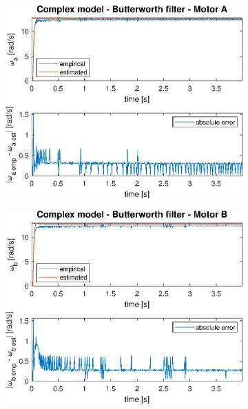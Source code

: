 \documentclass[a4paper,kul]{kulakarticle} %
\begin{document}
\begin{figure}[htp!]
\begin{subfigure}[b]{0.48\textwidth}
		\centering
		\includegraphics[width=\linewidth]{step_response_complex_BW_a.eps}
	\end{subfigure}
	\hfill
	\begin{subfigure}[b]{0.48\textwidth}
		\centering
		\includegraphics[width=\linewidth]{step_response_complex_BW_b.eps}
	\end{subfigure}
	\par\bigskip
	\begin{subfigure}[b]{0.48\textwidth}
		\centering

\end{subfigure}
\end{figure}
\end{document}
